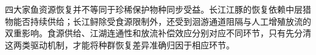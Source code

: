 四大家鱼资源恢复并不等同于珍稀保护物种同步受益。长江江豚的恢复依赖中层猎物能否持续供给；长江鲟除受食源限制外，还受到洄游通道阻隔与人工增殖放流的双重影响。食源供给、江湖连通性和放流补偿效应分别对应不同环节，只有先分清这两类驱动机制，才能将种群恢复差异准确归因于相应环节。
